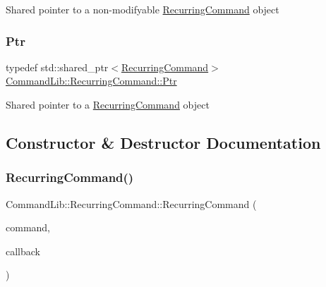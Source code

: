 Shared pointer to a non-\/modifyable \mbox{\hyperlink{class_command_lib_1_1_recurring_command}{Recurring\+Command}} object

\mbox{\label{class_command_lib_1_1_recurring_command_a458574df1804d7f1e4ba75e7aeb701e5}} 
\subsubsection{\texorpdfstring{Ptr}{Ptr}}
{\footnotesize\ttfamily typedef std\+::shared\+\_\+ptr$<$\mbox{\hyperlink{class_command_lib_1_1_recurring_command}{Recurring\+Command}}$>$ \mbox{\hyperlink{class_command_lib_1_1_recurring_command_a458574df1804d7f1e4ba75e7aeb701e5}{Command\+Lib\+::\+Recurring\+Command\+::\+Ptr}}}



Shared pointer to a \mbox{\hyperlink{class_command_lib_1_1_recurring_command}{Recurring\+Command}} object



\subsection{Constructor \& Destructor Documentation}
\mbox{\label{class_command_lib_1_1_recurring_command_a46723429ffa56b961949931cc4e51e22}} 
\subsubsection{\texorpdfstring{Recurring\+Command()}{RecurringCommand()}}
{\footnotesize\ttfamily Command\+Lib\+::\+Recurring\+Command\+::\+Recurring\+Command (\begin{DoxyParamCaption}\item[{\mbox{\hyperlink{class_command_lib_1_1_command_a3b3e4f00144373299df5c6bb1acc319d}{Command\+::\+Ptr}}}]{command,  }\item[{\mbox{\hyperlink{class_command_lib_1_1_recurring_command_1_1_execution_time_callback}{Execution\+Time\+Callback}} $\ast$}]{callback }\end{DoxyParamCaption})\hspace{0.3cm}{\ttfamily [protected]}}



